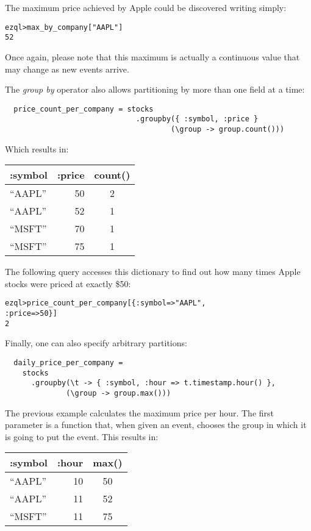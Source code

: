 \documentclass{report}
\newenvironment{evaluation}
{
  \framed
  \begin{alltt}
}
{
  \end{alltt}
  \endframed
}
\begin{document}
The maximum price achieved by Apple could be discovered writing
simply:

\begin{evaluation}
  ezql> max_by_company["AAPL"]
  52
\end{evaluation}

Once again, please note that this maximum is actually a continuous
value that may change as new events arrive.

The \emph{group by} operator also allows partitioning by more than one
field at a time:

\begin{verbatim}
  price_count_per_company = stocks
                              .groupby({ :symbol, :price }
                                      (\group -> group.count()))
\end{verbatim}

Which results in:

\begin{tabular}{ |l|r|c| }
  \hline
  :symbol & :price & count() \\
  \hline
  ``AAPL'' & 50 & 2 \\
  ``AAPL'' & 52 & 1 \\
  ``MSFT'' & 70 & 1 \\
  ``MSFT'' & 75 & 1 \\
  \hline
\end{tabular}

The following query accesses this dictionary to find out how many
times Apple stocks were priced at exactly \$50:

\begin{evaluation}
  ezql> price_count_per_company[\{ :symbol => "AAPL",
                                  :price => 50 \}]
  2
\end{evaluation}

Finally, one can also specify arbitrary partitions:

\begin{verbatim}
  daily_price_per_company =
    stocks
      .groupby(\t -> { :symbol, :hour => t.timestamp.hour() },
              (\group -> group.max()))
\end{verbatim}

The previous example calculates the maximum price per hour. The first
parameter is a function that, when given an event, chooses the group
in which it is going to put the event. This results in:

\begin{tabular}{ |l|r|c| }
  \hline
  :symbol & :hour & max() \\
  \hline
  ``AAPL'' & 10 & 50 \\
  ``AAPL'' & 11 & 52 \\
  ``MSFT'' & 11 & 75 \\
  \hline
\end{tabular}
\end{document}
